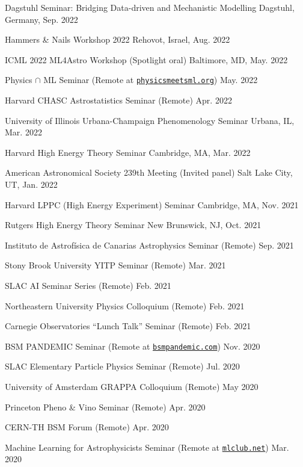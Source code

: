 \documentclass[letterpaper,11pt]{article}
\newenvironment{packed_itemize}{
\begin{itemize}[label=\raisebox{0.25ex}{\tiny$\bullet$}]
  \setlength{\itemsep}{4.2pt}
  \setlength{\parskip}{0pt}
  \setlength{\parsep}{0pt}}{\end{itemize}
}
\begin{document}
\begin{packed_itemize}
  \item Dagstuhl Seminar: Bridging Data-driven and Mechanistic Modelling \hfill Dagstuhl, Germany, Sep. 2022
  \item Hammers \& Nails Workshop 2022 \hfill Rehovot, Israel, Aug. 2022
  \item ICML 2022 ML4Astro Workshop (Spotlight oral) \hfill Baltimore, MD, May. 2022
  \item Physics $\cap$ ML Seminar (Remote at \href{http://www.physicsmeetsml.org//}{\texttt{physicsmeetsml.org}}) \hfill May. 2022
  \item Harvard CHASC Astrostatistics Seminar (Remote)  \hfill Apr. 2022
  \item University of Illinois Urbana-Champaign Phenomenology Seminar  \hfill Urbana, IL, Mar. 2022
  \item Harvard High Energy Theory Seminar \hfill Cambridge, MA, Mar. 2022
  \item American Astronomical Society 239th Meeting (Invited panel)  \hfill Salt Lake City, UT, Jan. 2022
  \item Harvard LPPC (High Energy Experiment) Seminar \hfill Cambridge, MA, Nov. 2021
  \item Rutgers High Energy Theory Seminar \hfill New Brunswick, NJ, Oct. 2021
  \item Instituto de Astrof\'{i}sica de Canarias Astrophysics Seminar (Remote) \hfill Sep. 2021
  \item Stony Brook University YITP Seminar (Remote) \hfill Mar. 2021
  \item SLAC AI Seminar Series (Remote) \hfill Feb. 2021
  \item Northeastern University Physics Colloquium (Remote) \hfill Feb. 2021
  \item Carnegie Observatories ``Lunch Talk'' Seminar (Remote) \hfill Feb. 2021
  \item BSM PANDEMIC Seminar  (Remote at \href{https://www.bsmpandemic.com/}{\texttt{bsmpandemic.com}}) \hfill Nov. 2020
  \item SLAC Elementary Particle Physics Seminar (Remote) \hfill Jul. 2020
  \item University of Amsterdam GRAPPA Colloquium (Remote) \hfill May 2020
  \item Princeton Pheno \& Vino Seminar (Remote) \hfill Apr. 2020
  \item CERN-TH BSM Forum (Remote) \hfill  Apr. 2020
  \item Machine Learning for Astrophysicists Seminar (Remote at \href{https://docs.google.com/document/d/1GGtE-YIuAWlmpKSr38_kyiF-Fklszhkh4FkiYWzBAho/pub}{\texttt{mlclub.net}}) \hfill  Mar. 2020

\end{packed_itemize}
\end{document}

